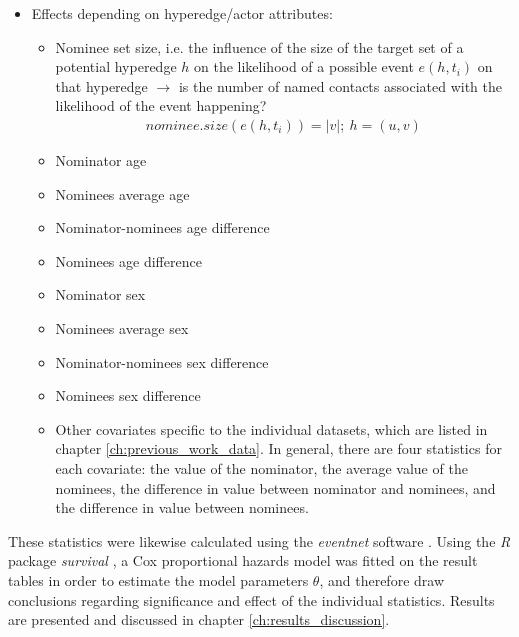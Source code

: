 \begin{itemize}
\begin{itemize}
	\end{itemize}
	\item Effects depending on hyperedge/actor attributes:
	\begin{itemize}
		\item Nominee set size, i.e. the influence of the size of the target set of a potential hyperedge $h$ on the likelihood of a possible event $e(h,t_i)$ on that hyperedge $\rightarrow$ is the number of named contacts associated with the likelihood of the event happening?
		\begin{align*}
			nominee.size(e(h,t_i)) = \lvert v \rvert; \: h = (u,v)
		\end{align*}
		\item Nominator age
		\item Nominees average age
		\item Nominator-nominees age difference
		\item Nominees age difference
		\item Nominator sex
		\item Nominees average sex
		\item Nominator-nominees sex difference
		\item Nominees sex difference
		\item Other covariates specific to the individual datasets, which are listed in chapter \ref{ch:previous_work_data}. In general, there are four statistics for each covariate: the value of the nominator, the average value of the nominees, the difference in value between nominator and nominees, and the difference in value between nominees.
	\end{itemize}
\end{itemize}

\noindent These statistics were likewise calculated using the \emph{eventnet} software \cite{eventnet_rem,eventnet_rhem}. Using the \emph{R} package \emph{survival} \cite{survival-package}, a Cox proportional hazards model was fitted on the result tables in order to estimate the model parameters $\theta$, and therefore draw conclusions regarding significance and effect of the individual statistics. Results are presented and discussed in chapter \ref{ch:results_discussion}.

